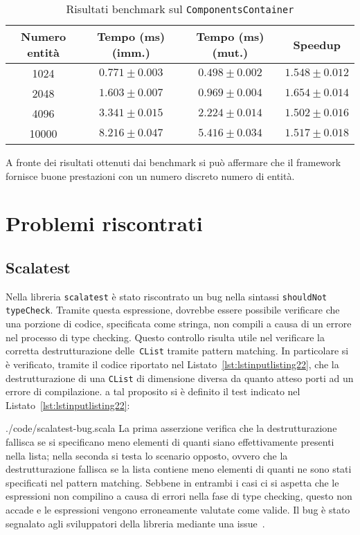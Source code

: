 \begin{table}[htp]
    \centering
    \begin{tabular}{c c c c}
        \toprule
        Numero entità & Tempo (ms) (imm.) & Tempo (ms) (mut.) & Speedup \\ \midrule
        1024 & $0.771 \pm 0.003$ & $0.498 \pm 0.002$ & $1.548 \pm 0.012$ \\
        2048 & $1.603 \pm 0.007$ & $0.969 \pm 0.004$ & $1.654 \pm 0.014$ \\
        4096 & $3.341 \pm 0.015$ & $2.224 \pm 0.014$ & $1.502 \pm 0.016$ \\
        10000 & $8.216 \pm 0.047$ & $5.416 \pm 0.034$ & $1.517 \pm 0.018$ \\
        \bottomrule
    \end{tabular}
    \caption{Risultati benchmark sul \texttt{ComponentsContainer}}\label{tab:componentscontainer-benchmark}
\end{table}

A fronte dei risultati ottenuti dai benchmark si può affermare che il framework fornisce buone prestazioni con un numero
discreto numero di entità.

\section{Problemi riscontrati}\label{sec:problemi-riscontrati}

\subsection{Scalatest}
Nella libreria \texttt{scalatest} è stato riscontrato un bug nella sintassi \texttt{shouldNot typeCheck}.
Tramite questa espressione, dovrebbe essere possibile verificare che una porzione di codice, specificata come stringa,
non compili a causa di un errore nel processo di type checking.
Questo controllo risulta utile nel verificare la corretta destrutturazione delle~\texttt{CList} tramite pattern
matching.
In particolare si è verificato, tramite il codice riportato nel Listato~\ref{lst:lstinputlisting22}, che la
destrutturazione di una \texttt{CList} di dimensione diversa da quanto atteso porti ad un errore di compilazione.
a tal proposito si è definito il test indicato nel Listato~\ref{lst:lstinputlisting22}:

{./code/scalatest-bug.scala}
La prima asserzione verifica che la destrutturazione fallisca se si specificano meno elementi di quanti siano
effettivamente presenti nella lista;
nella seconda si testa lo scenario opposto, ovvero che la destrutturazione fallisca se la lista contiene meno elementi
di quanti ne sono stati specificati nel pattern matching.
Sebbene in entrambi i casi ci si aspetta che le espressioni non compilino a causa di errori nella fase di type checking,
questo non accade e le espressioni vengono erroneamente valutate come valide.
Il bug è stato segnalato agli sviluppatori della libreria mediante una issue~\cite{scalatest-bug}.

